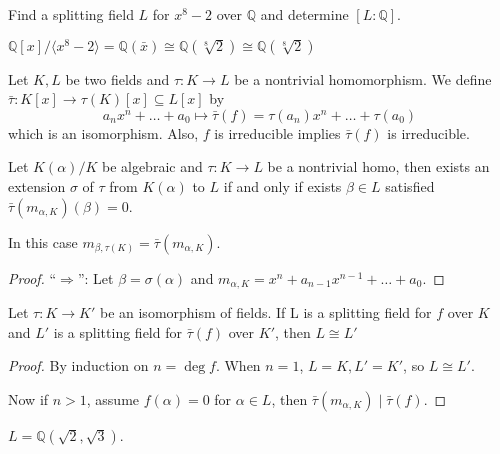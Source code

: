 \begin{example}
  Find a splitting field $L$ for $x^8 - 2$ over $\mathbb{Q}$ and determine $[L : \mathbb{Q}]$.
\end{example}

\begin{remark}
  $\mathbb{Q}[x] / \langle x^8 - 2 \rangle= \mathbb{Q}(\bar{x}) \cong \mathbb{Q}(\sqrt[8]{2})
  \cong \mathbb{Q}(\sqrt[8]{2})$
\end{remark}

\begin{prop}
  Let $K, L$ be two fields and $\tau: K \to L$ be a nontrivial homomorphism.
  We define $\bar\tau : K[x] \to \tau(K)[x] \subseteq L[x]$ by
  \[ a_n x^n + \ldots + a_0 \mapsto \bar\tau(f) = \tau(a_n)x^n + \ldots + \tau(a_0) \]
  which is an isomorphism. Also, $f$ is irreducible implies $\bar\tau(f)$ is irreducible.
\end{prop}

\begin{lemma}
  Let $K(\alpha) / K$ be algebraic and $\tau: K \to L$ be a nontrivial homo,
  then exists an extension $\sigma$ of $\tau$ from $K(\alpha)$ to $L$ if and only if
  exists $\beta \in L$ satisfied $\bar\tau(m_{\alpha, K})(\beta) = 0$.

  In this case $m_{\beta, \tau(K)} = \bar\tau(m_{\alpha, K})$.
\end{lemma}

\begin{proof}
  ``$\Rightarrow$'': Let $\beta = \sigma(\alpha)$ and $m_{\alpha, K} = x^n + a_{n-1} x^{n-1} + \ldots + a_0$.
\end{proof}

\begin{theorem}
  Let $\tau: K \to K'$ be an isomorphism of fields.
  If L is a splitting field for $f$ over $K$ and $L'$ is a splitting field for $\bar\tau(f)$
  over $K'$, then $L \cong L'$
\end{theorem}

\begin{proof}
  By induction on $n = \deg f$. When $n = 1$, $L = K, L' = K'$, so $L \cong L'$.

  Now if $n > 1$, assume $f(\alpha) = 0$ for $\alpha \in L$, then $\bar\tau(m_{\alpha, K}) \mid \bar\tau(f)$.
\end{proof}

\begin{example}
  $L = \mathbb{Q}(\sqrt{2}, \sqrt{3})$.
\end{example}
